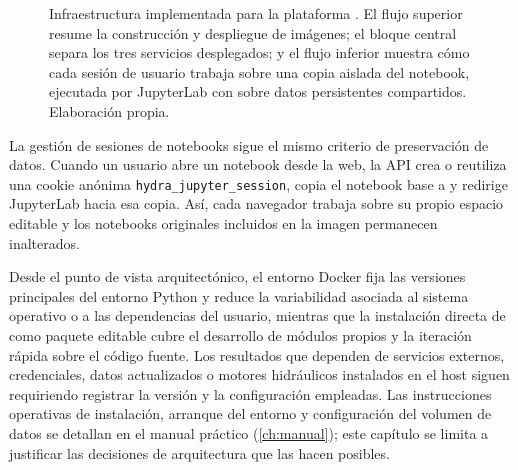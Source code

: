 \begin{figure}[p]
{
}
\caption{Infraestructura implementada para la plataforma \hydra. El flujo superior resume la construcción y despliegue de imágenes; el bloque central separa los tres servicios desplegados; y el flujo inferior muestra cómo cada sesión de usuario trabaja sobre una copia aislada del notebook, ejecutada por JupyterLab con \pyhydra sobre datos persistentes compartidos. Elaboración propia.}
\label{fig:despliegue_azure_hydra}
\end{figure}

La gestión de sesiones de notebooks sigue el mismo criterio de preservación de datos. Cuando un usuario abre un notebook desde la web, la API crea o reutiliza una cookie anónima \texttt{hydra\_jupyter\_session}, copia el notebook base a  y redirige JupyterLab hacia esa copia. Así, cada navegador trabaja sobre su propio espacio editable y los notebooks originales incluidos en la imagen permanecen inalterados.

Desde el punto de vista arquitectónico, el entorno Docker fija las versiones principales del entorno Python y reduce la variabilidad asociada al sistema operativo o a las dependencias del usuario, mientras que la instalación directa de \pyhydra como paquete editable cubre el desarrollo de módulos propios y la iteración rápida sobre el código fuente. Los resultados que dependen de servicios externos, credenciales, datos actualizados o motores hidráulicos instalados en el host siguen requiriendo registrar la versión y la configuración empleadas. Las instrucciones operativas de instalación, arranque del entorno y configuración del volumen de datos se detallan en el manual práctico (\cref{ch:manual}); este capítulo se limita a justificar las decisiones de arquitectura que las hacen posibles.

